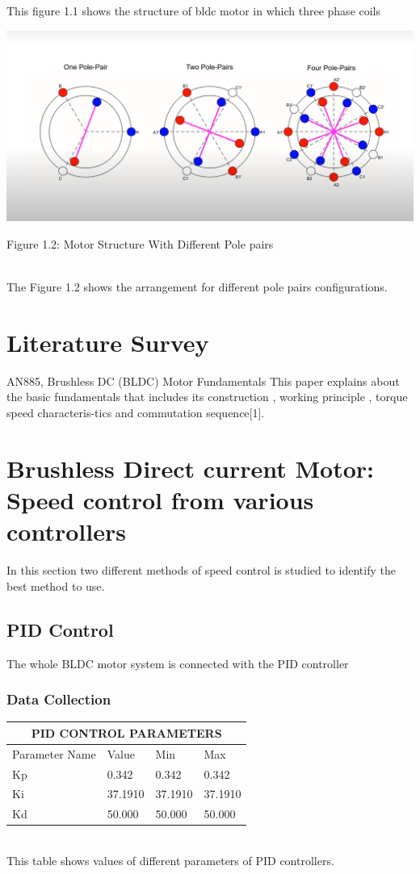 \documentclass[12pt,openright,twoside]{report}
\begin{document}
 This figure 1.1 shows the structure of bldc motor in which three phase coils 
\vspace{2cm}

\centering
\centerline{\includegraphics[scale=.5]{MOTOR STRUCTURE pp.png}}
\caption{Figure 1.2: Motor Structure With Different Pole pairs}
\vspace{2cm}
\\The Figure 1.2 shows the arrangement for different pole pairs configurations. 

\chapter{Literature Survey}
\usepackage{}
\justifying
AN885, Brushless DC (BLDC) Motor Fundamentals This paper explains about the basic fundamentals that includes its construction , working principle , torque speed characteris-tics and commutation sequence[1]. 




\chapter{Brushless Direct current Motor: Speed control  from various controllers }
In this section two different methods of speed control is studied to identify the best method to use. 

\section{PID Control}
The whole BLDC motor system is connected with the PID controller

 
\subsection{Data Collection}

\begin{tabular}{ |p{3cm}||p{3cm}|p{3cm}|p{3cm}|  }
\hline
\multicolumn{4}{|c|}{PID CONTROL PARAMETERS} \\
\hline
Parameter Name & Value & Min & Max\\
\hline
Kp  & 0.342  &0.342 &0.342 \\
Ki&  37.1910  &37.1910  &37.1910\\
Kd &50.000& 50.000& 50.000\\
\hline
\end{tabular}
\vspace{2cm}
\\This table shows values of different parameters of PID controllers.
\end{document}
